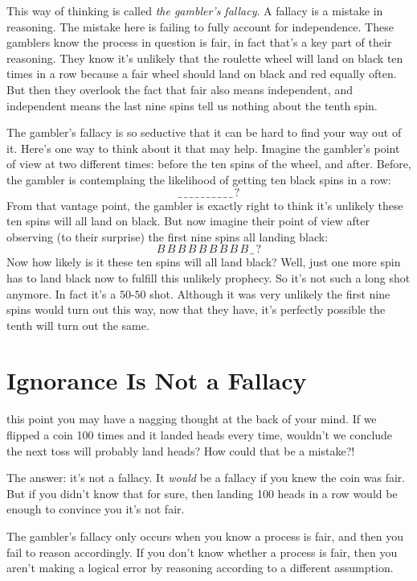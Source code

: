 \documentclass[justified]{tufte-book}
\theoremstyle{definition}
\theoremstyle{definition}
\theoremstyle{definition}
\theoremstyle{remark}
\begin{document}
This way of thinking is called \emph{the gambler's fallacy}. A fallacy is a mistake in reasoning. The mistake here is failing to fully account for independence. These gamblers know the process in question is fair, in fact that's a key part of their reasoning. They know it's unlikely that the roulette wheel will land on black ten times in a row because a fair wheel should land on black and red equally often. But then they overlook the fact that fair also means independent, and independent means the last nine spins tell us nothing about the tenth spin.

The gambler's fallacy is so seductive that it can be hard to find your way out of it. Here's one way to think about it that may help. Imagine the gambler's point of view at two different times: before the ten spins of the wheel, and after. Before, the gambler is contemplaing the likelihood of getting ten black spins in a row:
\[  \_ \, \_ \,\_ \,\_ \,\_ \,\_ \,\_ \,\_ \,\_ \,\_ \, ? \]
From that vantage point, the gambler is exactly right to think it's unlikely these ten spins will all land on black. But now imagine their point of view after observing (to their surprise) the first nine spins all landing black:
\[ B \, B \, B \, B \, B \, B \, B \, B \, B  \, \_ \,? \]
Now how likely is it these ten spins will all land black? Well, just one more spin has to land black now to fulfill this unlikely prophecy. So it's not such a long shot anymore. In fact it's a \(50\)-\(50\) shot. Although it was very unlikely the first nine spins would turn out this way, now that they have, it's perfectly possible the tenth will turn out the same.

\hypertarget{ignorance-is-not-a-fallacy}{%
\section{Ignorance Is Not a Fallacy}\label{ignorance-is-not-a-fallacy}}

 this point you may have a nagging thought at the back of your mind. If we flipped a coin 100 times and it landed heads every time, wouldn't we conclude the next toss will probably land heads? How could that be a mistake?!

The answer: it's not a fallacy. It \emph{would} be a fallacy if you knew the coin was fair. But if you didn't know that for sure, then landing 100 heads in a row would be enough to convince you it's not fair.

The gambler's fallacy only occurs when you know a process is fair, and then you fail to reason accordingly. If you don't know whether a process is fair, then you aren't making a logical error by reasoning according to a different assumption.
\end{document}
